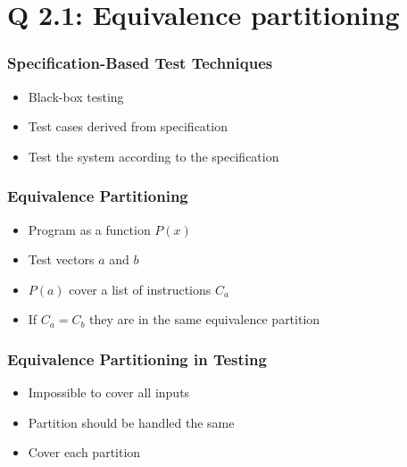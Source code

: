 
\section{Q 2.1: Equivalence partitioning}

\begin{frame}
    \frametitle{Specification-Based Test Techniques}
    \begin{itemize}
        \item Black-box testing
        \item Test cases derived from specification
        \item Test the system according to the specification
    \end{itemize}
\end{frame}

\begin{frame}
    \frametitle{Equivalence Partitioning}
    \begin{itemize}
        \item Program as a function $P(x)$
        \item Test vectors $a$ and $b$
        \item $P(a)$ cover a list of instructions $C_a$
        \item If $C_a = C_b$ they are in the same equivalence partition
    \end{itemize}
\end{frame}

\begin{frame}
    \frametitle{Equivalence Partitioning in Testing}
    \begin{itemize}
        \item Impossible to cover all inputs
        \item Partition should be handled the same
        \item Cover each partition
    \end{itemize}
\end{frame}


